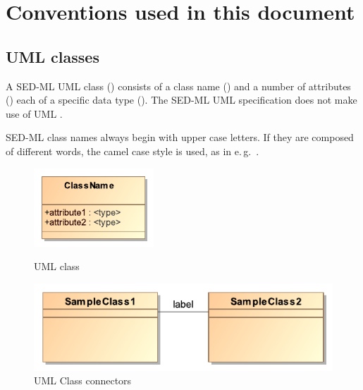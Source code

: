 \section{Conventions used in this document}
\label{sec:conventions}

\subsection{UML classes}
\label{sec:umlconventions}
A SED-ML UML class () consists of a class name () and a number of attributes () each of a specific data type (). The SED-ML UML specification does not make use of UML .

SED-ML class names always begin with upper case letters. If they are composed of different words, the camel case style is used, as in e.\,g.\ .

\begin{figure}[h]
\centering
\begin{minipage}{.5\textwidth}
	\centering
	\includegraphics[width=0.4\textwidth]{images/pdf/umlClass}
	\caption{UML class}
	\label{fig:umlClass}    
\end{minipage}%
\begin{minipage}{.5\textwidth}
	\centering
	\includegraphics[width=1.0\textwidth]{images/pdf/classRelation}
	\caption{UML Class connectors}
	\label{fig:umlConnectors}
\end{minipage}
\end{figure}

